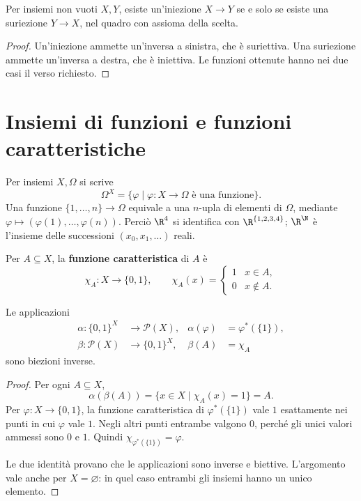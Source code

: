 \begin{corollario}
Per insiemi non vuoti $X,Y$, esiste un'iniezione $X\to Y$ se e solo se esiste una suriezione $Y\to X$, nel quadro con assioma della scelta.
\end{corollario}
\begin{proof}
Un'iniezione ammette un'inversa a sinistra, che è suriettiva. Una suriezione ammette un'inversa a destra, che è iniettiva. Le funzioni ottenute hanno nei due casi il verso richiesto.
\end{proof}

\section{Insiemi di funzioni e funzioni caratteristiche}
\begin{definizione}
Per insiemi $X,\Omega$ si scrive
\[
\Omega^X=\{\varphi\mid \varphi:X\to\Omega\text{ è una funzione}\}.
\]
Una funzione $\{1,\ldots,n\}\to\Omega$ equivale a una $n$-upla di elementi di $\Omega$, mediante $\varphi\mapsto(\varphi(1),\ldots,\varphi(n))$. Perciò $\R^4$ si identifica con $\R^{\{1,2,3,4\}}$; $\R^\N$ è l'insieme delle successioni $(x_0,x_1,\ldots)$ reali.
\end{definizione}

\begin{definizione}
Per $A\subseteq X$, la \textbf{funzione caratteristica} di $A$ è
\[
\chi_A:X\to\{0,1\},\qquad
\chi_A(x)=\begin{cases}1&x\in A,\\0&x\notin A.\end{cases}
\]
\end{definizione}

\begin{teorema}\label{teo:caratteristiche}
Le applicazioni
\[
\begin{aligned}
\alpha:\{0,1\}^X&\to\mathcal P(X),&\alpha(\varphi)&=\varphi^*(\{1\}),\\
\beta:\mathcal P(X)&\to\{0,1\}^X,&\beta(A)&=\chi_A
\end{aligned}
\]
sono biezioni inverse.
\end{teorema}
\begin{proof}
 Per ogni $A\subseteq X$,
\[
\alpha(\beta(A))=\{x\in X\mid\chi_A(x)=1\}=A.
\]
 Per $\varphi:X\to\{0,1\}$, la funzione caratteristica di $\varphi^*(\{1\})$ vale $1$ esattamente nei punti in cui $\varphi$ vale $1$. Negli altri punti entrambe valgono $0$, perché gli unici valori ammessi sono $0$ e $1$. Quindi $\chi_{\varphi^*(\{1\})}=\varphi$.

Le due identità provano che le applicazioni sono inverse e biettive. L'argomento vale anche per $X=\varnothing$: in quel caso entrambi gli insiemi hanno un unico elemento.
\end{proof}
